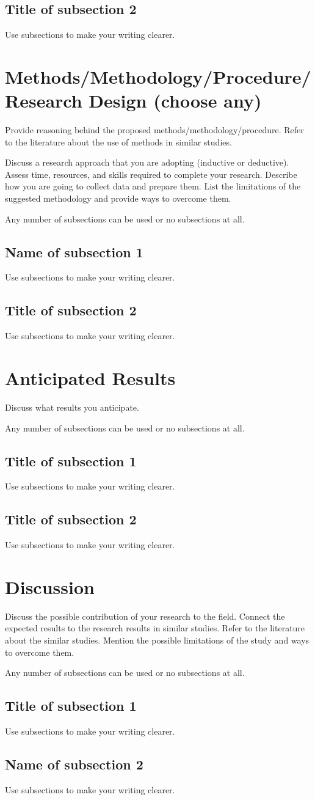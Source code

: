 \documentclass[oneside,final,12pt,a4paper]{extreport}
\begin{document}
\subsection{Title of subsection 2}
Use subsections to make your writing clearer.

\section{Methods/Methodology/Procedure/Research Design (choose any)}
Provide reasoning behind the proposed methods/methodology/procedure. Refer to the literature about the use of methods in similar studies. 

Discuss a research approach that you are adopting (inductive or deductive). Assess time, resources, and skills required to complete your research. Describe how you are going to collect data and prepare them. List the limitations of the suggested methodology and provide ways to overcome them.


Any number of subsections can be used or no subsections at all.
\subsection{Name of subsection 1}
Use subsections to make your writing clearer.
\subsection{Title of subsection 2}
Use subsections to make your writing clearer. 
\section{Anticipated Results}
Discuss what results you anticipate. 

Any number of subsections can be used or no subsections at all.
\subsection{Title of subsection 1}
Use subsections to make your writing clearer.
\subsection{Title of subsection 2}
Use subsections to make your writing clearer.
\section{Discussion}
Discuss the possible contribution of your research to the field. Connect the expected results to the research results in similar studies. Refer to the literature about the similar studies. Mention the possible limitations of the study and ways to overcome them.

Any number of subsections can be used or no subsections at all.
\subsection{Title of subsection 1}
Use subsections to make your writing clearer.
\subsection{Name of subsection 2}
Use subsections to make your writing clearer.
\newpage
\printbibliography[heading=bibintoc,title={References}]
\end{document}
